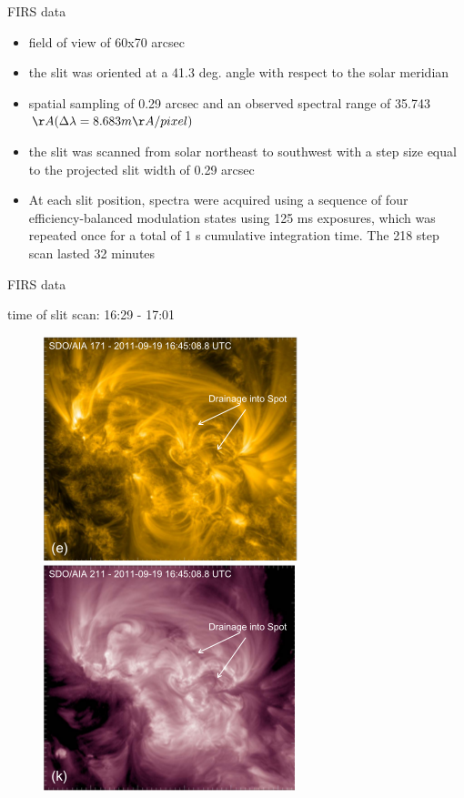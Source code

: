 \documentclass{beamer}
\begin{document}
\begin{frame}{FIRS data}
\begin{itemize}
\item field of view of 60x70 arcsec
\item the slit
was oriented at a 41.3 deg. angle with respect to the solar meridian
\item spatial sampling of 0.29 arcsec and an observed
spectral range of 35.743 $\AA (\Delta \lambda = 8.683 m\AA / pixel )$ 
\item the slit was scanned from solar
northeast to southwest with a step size equal to the projected
slit width of 0.29 arcsec 
\item At each slit position, spectra were acquired
using a sequence of four efficiency-balanced modulation states
using 125 ms exposures, which was repeated once for a total of
1 s cumulative integration time. The 218 step scan lasted
32 minutes

\end{itemize}
\end{frame}


\begin{frame}{FIRS data}

time of slit scan: 16:29 - 17:01

\begin{figure}[H]
  \centering
  \begin{minipage}[b]{0.4\textwidth}
    \includegraphics[scale=0.5]{img3.png}
  \end{minipage}
  \hfill
  \begin{minipage}[b]{0.4\textwidth}
    \includegraphics[scale=0.5]{img4.png}
  \end{minipage}
\end{figure}

 



\end{frame}
\end{document}
